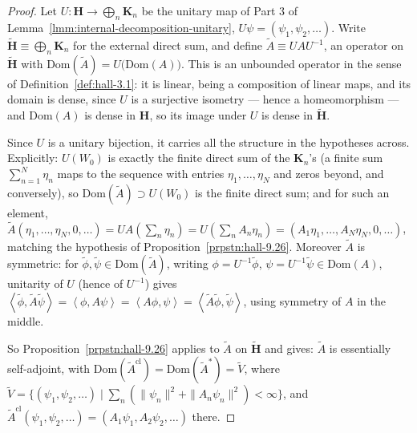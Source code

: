 \begin{proof}
    \leanok
Let $U : \mathbf{H} \to \bigoplus_n \mathbf{K}_n$ be the unitary map of Part 3 of Lemma~\ref{lmm:internal-decomposition-unitary}, $U\psi = (\psi_1,\psi_2,\ldots)$. Write $\widetilde{\mathbf{H}} \equiv \bigoplus_n \mathbf{K}_n$ for the external direct sum, and define $\widetilde{A} \equiv UAU^{-1}$, an operator on $\widetilde{\mathbf{H}}$ with $\text{Dom}(\widetilde{A}) = U\big(\text{Dom}(A)\big)$. This is an unbounded operator in the sense of Definition~\ref{def:hall-3.1}: it is linear, being a composition of linear maps, and its domain is dense, since $U$ is a surjective isometry — hence a homeomorphism — and $\text{Dom}(A)$ is dense in $\mathbf{H}$, so its image under $U$ is dense in $\widetilde{\mathbf{H}}$.

Since $U$ is a unitary bijection, it carries all the structure in the hypotheses across. Explicitly: $U(W_0)$ is exactly the finite direct sum of the $\mathbf{K}_n$'s (a finite sum $\sum_{n=1}^N \eta_n$ maps to the sequence with entries $\eta_1,\ldots,\eta_N$ and zeros beyond, and conversely), so $\text{Dom}(\widetilde{A}) \supset U(W_0)$ is the finite direct sum; and for such an element, $\widetilde{A}(\eta_1,\ldots,\eta_N,0,\ldots) = U A \left( \sum_n \eta_n \right) = U\left( \sum_n A_n\eta_n \right) = (A_1\eta_1,\ldots,A_N\eta_N,0,\ldots)$, matching the hypothesis of Proposition~\ref{prpstn:hall-9.26}. Moreover $\widetilde{A}$ is symmetric: for $\widetilde\phi,\widetilde\psi \in \text{Dom}(\widetilde{A})$, writing $\phi = U^{-1}\widetilde\phi$, $\psi = U^{-1}\widetilde\psi \in \text{Dom}(A)$, unitarity of $U$ (hence of $U^{-1}$) gives $\left< \widetilde\phi, \widetilde{A}\widetilde\psi \right> = \left< \phi, A\psi \right> = \left< A\phi, \psi \right> = \left< \widetilde{A}\widetilde\phi, \widetilde\psi \right>$, using symmetry of $A$ in the middle.

So Proposition~\ref{prpstn:hall-9.26} applies to $\widetilde{A}$ on $\widetilde{\mathbf{H}}$ and gives: $\widetilde{A}$ is essentially self-adjoint, with $\text{Dom}(\widetilde{A}^{\text{cl}}) = \text{Dom}(\widetilde{A}^*) = \widetilde{V}$, where $\widetilde{V} = \{ (\psi_1,\psi_2,\ldots) \mid \sum_n ( \|\psi_n\|^2 + \|A_n\psi_n\|^2 ) < \infty \}$, and $\widetilde{A}^{\text{cl}}(\psi_1,\psi_2,\ldots) = (A_1\psi_1, A_2\psi_2,\ldots)$ there.


\end{proof}
